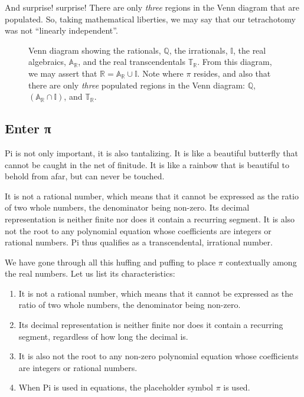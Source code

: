 \documentclass[
  a4paper,
]{article}
\begin{document}
And surprise! surprise! There are only \emph{three} regions in the Venn
diagram that are populated. So, taking mathematical liberties, we may
say that our tetrachotomy was not ``linearly independent''.

\begin{figure}
\centering

\caption{Venn diagram showing the rationals, \(\mathbb{Q}\), the
irrationals, \(\mathbb{I}\), the real algebraics,
\(\mathbb{A_{\mathbb{R}}}\), and the real transcendentals
\(\mathbb{T_{\mathbb{R}}}\). From this diagram, we may assert that
\(\mathbb{R} = \mathbb{A_{\mathbb{R}}} \cup \mathbb{I}\). Note where
\(\pi\) resides, and also that there are only \emph{three} populated
regions in the Venn diagram: \(\mathbb{Q}\),
\((\mathbb{A_{\mathbb{R}}} \cap \mathbb{I})\), and
\(\mathbb{T_{\mathbb{R}}}\).}\label{fig:venn-tetra}
\end{figure}

\subsection{Enter π}\label{enter-ux3c0}

Pi is not only important, it is also tantalizing. It is like a beautiful
butterfly that cannot be caught in the net of finitude. It is like a
rainbow that is beautiful to behold from afar, but can never be touched.

It is not a rational number, which means that it cannot be expressed as
the ratio of two whole numbers, the denominator being non-zero. Its
decimal representation is neither finite nor does it contain a recurring
segment. It is also not the root to any polynomial equation whose
coefficients are integers or rational numbers. Pi thus qualifies as a
transcendental, irrational number.

We have gone through all this huffing and puffing to place \(\pi\)
contextually among the real numbers. Let us list its characteristics:

\begin{enumerate}
\item
  It is not a rational number, which means that it cannot be expressed
  as the ratio of two whole numbers, the denominator being non-zero.
\item
  Its decimal representation is neither finite nor does it contain a
  recurring segment, regardless of how long the decimal is.
\item
  It is also not the root to any non-zero polynomial equation whose
  coefficients are integers or rational numbers.
\item
  When Pi is used in equations, the placeholder symbol \(\pi\) is used.
\end{enumerate}
\end{document}
